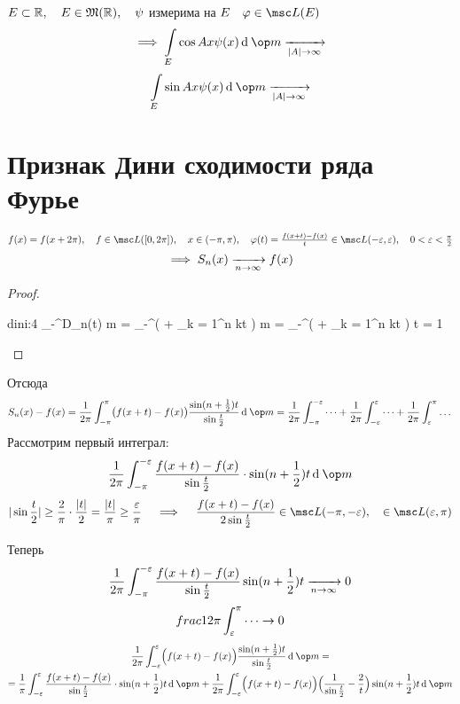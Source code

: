 \begin{lemma}
	$ E \subset \mathbb{R}, \quad E \in \mathfrak M(\mathbb{R}), \quad \psi $ измерима на $ E \quad \phi \in \msc L(E) $
	$$ \implies \int\limits_E \cos A x \psi(x) \di \op m \underarr{|A| \to \infty} $$
	$$ \int\limits_E \sin A x \psi(x) \di \op m \underarr{|A| \to \infty} $$
\end{lemma}

\section{Признак Дини сходимости ряда Фурье}

\begin{theorem}
	$ f(x) = f(x + 2\pi), \quad f \in \msc L([0, 2\pi]), \quad x \in (-\pi, \pi), \quad \phi(t) = \frac{f(x + t) - f(x)}t \in \msc L(-\eps, \eps), \quad 0 < \eps < \frac \pi 2 $
	$$ \implies S_n(x) \xrightarrow[n \to \infty]{} f(x) $$
\end{theorem}

\begin{proof}
	\begin{equ}{dini:4}
		 \int_{-\pi}^\pi D_n(t) \di \op m =  \pi \int_{-\pi}^\pi \Bigl(  + \sum_{k = 1}^n \cos kt \Bigr) \di \op m =  \pi \int_{-\pi}^\pi \bigl(  + \sum_{k = 1}^n \cos kt \bigr) \di \op t = 1
	\end{equ}
\end{proof}

Отсюда
$$ S_n(x) - f(x) = \frac1{2\pi} \int_{-\pi}^\pi \bigl( f(x + t) - f(x) \bigr) \frac{\sin(n + \frac12)t}{\sin \frac t2} \di \op m =
\frac1{2\pi} \int_{-\pi}^{-\eps} \dots + \frac1{2\pi} \int_{-\eps}^\eps \dots + \frac1{2\pi} \int_\eps^\pi \dots $$
Рассмотрим первый интеграл:
$$ \frac1{2\pi} \int_{-\pi}^{-\eps} \frac{f(x + t) - f(x)}{\sin \frac t2} \cdot \sin (n + \frac12)t \di \op m $$
$$ |\sin \frac t2 | \ge \frac 2\pi \cdot \frac{|t|}2 = \frac{|t|}\pi \ge \frac \eps \pi \quad \implies \quad \frac{f(x + t) - f(x)}{2 \sin \frac t2} \in \msc L(-\pi, -\eps), \quad \in \msc L(\eps, \pi) $$

Теперь
$$ \frac1{2\pi} \int_{-\pi}^{-\varepsilon} \frac{f(x + t) - f(x)}{\sin \frac t2} \sin(n + \frac12)t \xrightarrow[n \to \infty]{} 0 $$
$$ \\frac1{2\pi} \int_\varepsilon^\pi \dots \to 0 $$
\begin{multline*}
	\frac1{2\pi} \int_{-\eps}^\eps \Bigl( f(x + t) - f(x) \Bigr) \frac{\sin(n + \frac12)t}{\sin \frac t2} \di \op m = \\
	= \frac1 \pi \int_{-\eps}^\eps \frac{f(x + t) - f(x)}{\sin \frac t2} \cdot \sin (n + \frac12) t \di \op m + \frac1{2\pi} \int_{-\eps}^\eps \Bigl( f(x + t) - f(x) \Bigr) \Bigl( \frac1{\sin \frac t2} - \frac 2t \Bigr) \sin(n + \frac12)t \di \op m
\end{multline*}

